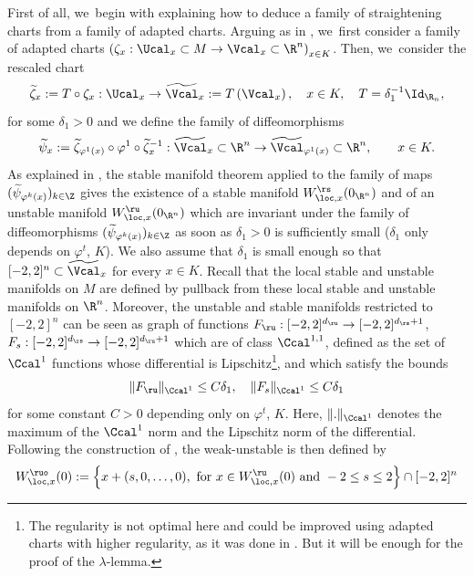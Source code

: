 \begin{appendix}
First of all, we~begin with explaining how to deduce a family of straightening charts from a family of adapted charts. Arguing as in \cite[p.\,36]{dyatlov}, we~first consider a family of adapted charts $\left(\zeta_x: \Ucal_x \subset M \to \Vcal_x \subset \R^n \right)_{x \in K}$. Then, we~consider the rescaled chart
\[
\widetilde{\zeta}_x:= T \circ \zeta_x: \Ucal_x \to \widetilde{ \Vcal}_{x}:= T\left(\Vcal_{x} \right), \quad x \in K, \quad T = \delta_1^{-1} \Id_{\R_n},
\]
for some $\delta_1 > 0$ and we define the family of diffeomorphisms
\[
\widetilde{\psi}_x:= \widetilde{\zeta}_{\varphi^1 (x)} \circ \varphi^1 \circ \widetilde{\zeta}_{x}^{-1}: \widetilde{\Vcal}_x \subset \R^n \to \widetilde{\Vcal}_{\varphi^1 (x)} \subset \R^n, \qquad x \in K.
\]
As explained in \cite[\S 3.4]{dyatlov}, the stable manifold theorem applied to the family of maps $(\widetilde{\psi}_{\varphi^k (x)})_{k \in \Z}$ gives the existence of a stable manifold $W_{\loc,x}^\rs (0_{\R^n})$ and of an unstable manifold $W_{\loc,x}^\ru (0_{\R^n})$ which are invariant under the family of diffeomorphisms $(\widetilde{\psi}_{\varphi^k (x)})_{k \in \Z}$ as soon as $\delta_1 > 0$ is sufficiently small ($\delta_1$ only depends on $\varphi^t$, $K$). We also assume that $\delta_1$ is small enough so that $[-2,2]^n \subset \widetilde{\Vcal}_x$ for every $x \in K$. Recall that the local stable and unstable manifolds on $M$ are defined by pullback from these local stable and unstable manifolds on $\R^n$.
Moreover, the unstable and stable manifolds restricted to $[-2,2]^n$ can be seen as graph of functions $F_\ru: [-2,2]^{d_\ru} \to [-2,2]^{d_\rs + 1}$, $F_s: [-2,2]^{d_\rs} \to [-2,2]^{d_\ru + 1}$ which are of class $\Ccal^{1,1}$, defined as the set of $\Ccal^1$ functions whose differential is Lipschitz\footnote{The regularity is not optimal here and could be improved using adapted charts with higher regularity, as it was done in \cite{dyatlov}. But it will be enough for the proof of the $\lambda$-lemma.}, and which satisfy the bounds
\begin{equation}\label{eq: bound Fu and Fs}
\| F_\ru \|_{\Ccal^{1}} \leq C \delta_1, \quad \| F_s \|_{\Ccal^{1}} \leq C \delta_1
\end{equation}
for some constant $C > 0$ depending only on $\varphi^t$, $K$. Here, $\|.\|_{\Ccal^{1}}$ denotes the maximum of the $\Ccal^1$ norm and the Lipschitz norm of the differential. Following the construction of \cite{dyatlov}, the weak-unstable is then defined by
\[
W_{\loc,x}^{\ruo} (0):= \left\{ x + (s,0,\dots, 0), \text{ for } x \in W_{\loc,x}^\ru (0) \text{ and } -2 \leq s \leq 2 \right\} \cap [-2,2]^n
\]
\end{appendix}
